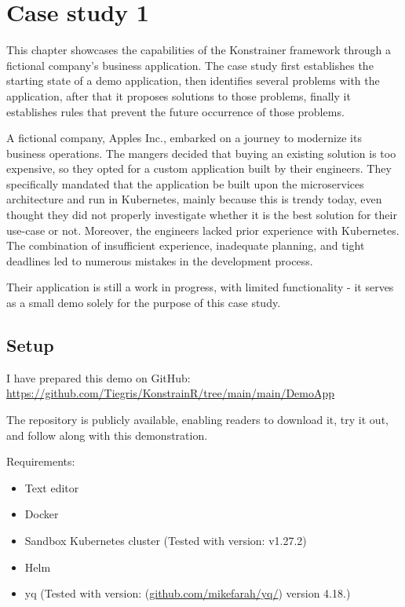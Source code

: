 \chapter{Case study 1}
\label{chap:case_study1}

This chapter showcases the capabilities of the Konstrainer framework through a fictional company's business application. The case study first establishes the starting state of a demo application, then identifies several problems with the application, after that it proposes solutions to those problems, finally it establishes rules that prevent the future occurrence of those problems.

A fictional company, Apples Inc., embarked on a journey to modernize its business operations. The mangers decided that buying an existing solution is too expensive, so they opted for a custom application built by their engineers. They specifically mandated that the application be built upon the microservices architecture and run in Kubernetes, mainly because this is trendy today, even thought they did not properly investigate whether it is the best solution for their use-case or not. Moreover, the engineers lacked prior experience with Kubernetes. The combination of insufficient experience, inadequate planning, and tight deadlines led to numerous mistakes in the development process.

Their application is still a work in progress, with limited functionality - it serves as a small demo solely for the purpose of this case study.

\section{Setup}

I have prepared this demo on GitHub: \url{https://github.com/Tiegris/KonstrainR/tree/main/main/DemoApp}

The repository is publicly available, enabling readers to download it, try it out, and follow along with this demonstration. 

Requirements:

\begin{itemize}
    \item Text editor
    \item Docker
    \item Sandbox Kubernetes cluster (Tested with version: v1.27.2)
    \item Helm
    \item yq (Tested with version: (\url{github.com/mikefarah/yq/}) version 4.18.)
\end{itemize}

